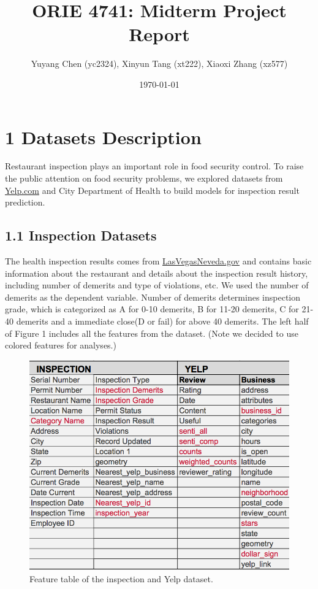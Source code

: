\documentclass[letterpaper, 11 pt, conference]{ieeeconf}
\title{ORIE 4741: Midterm Project Report}
\author{Yuyang Chen (yc2324), Xinyun Tang (xt222), Xiaoxi Zhang (xz577)}
\date{\today}
\begin{document}
\maketitle

\section*{1 Datasets Description}
\label{sec:introduction}

Restaurant inspection plays an important role in food security control. To raise the public attention on food security problems, we explored datasets from \url{Yelp.com} and City Department of Health to build models for inspection result prediction. 

\subsection*{1.1 Inspection Datasets}

The health inspection results comes from \url{LasVegasNeveda.gov} and contains basic information about the restaurant and details about the inspection result history, including number of demerits and type of violations, etc. We used the number of demerits as the dependent variable. Number of demerits determines inspection grade, which is categorized as A for 0-10 demerits, B for 11-20 demerits, C for 21-40 demerits and a immediate close(D or fail) for above 40 demerits. The left half of Figure 1 includes all the features from the dataset. (Note we decided to use colored features for analyses.)

\begin{figure}[h]
	\centering
    \includegraphics[scale=0.53]{all_features_pic}
    \caption{Feature table of the inspection and Yelp dataset.}
\end{figure}
\end{document}
